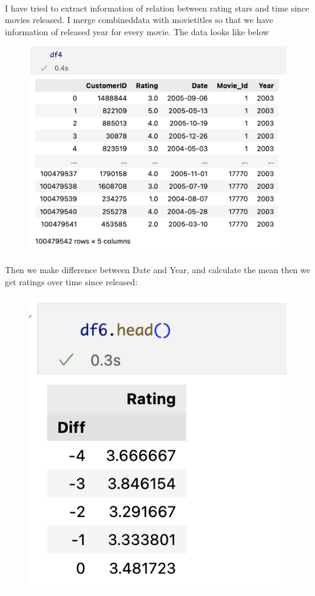 \documentclass{article}
\begin{document}
\begin{enumerate}
\\I have tried to extract information of relation between rating stars and time since movies released. I merge combined\textunderscore data with movie\textunderscore titles so that we have information of released year for every movie. The data looks like below
\begin{figure}[H]
\centering
\includegraphics[width = 14cm]{images/merged data.png}
\end{figure}
Then we make difference between Date and Year, and calculate the mean then we get ratings over time since released\(:\)
\begin{figure}[H]
\centering
\includegraphics{images/df6.png}

\end{figure}
\end{enumerate}
\end{document}
